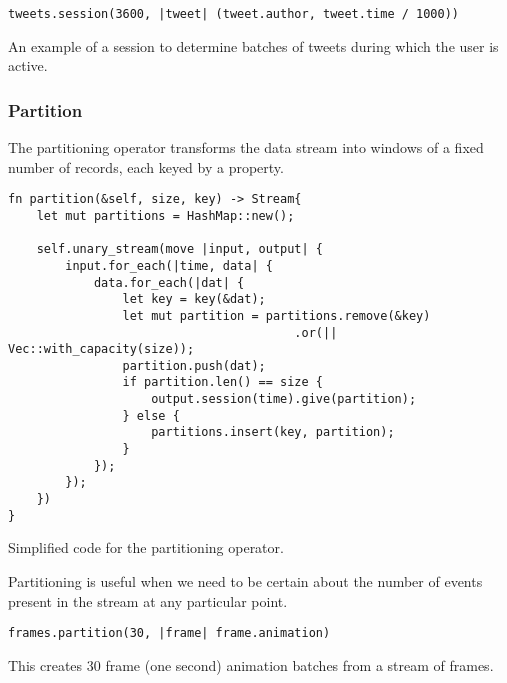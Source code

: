 \begin{listing}[H]
\begin{verbatim}
tweets.session(3600, |tweet| (tweet.author, tweet.time / 1000))
\end{verbatim}
\caption{An example of a session to determine batches of tweets during which the user is active.}
\label{lst:session-example}
\end{listing}

\subsubsection{Partition}
The partitioning operator transforms the data stream into windows of a fixed number of records, each keyed by a property.

\begin{listing}[H]
\begin{verbatim}
fn partition(&self, size, key) -> Stream{
    let mut partitions = HashMap::new();

    self.unary_stream(move |input, output| {
        input.for_each(|time, data| {
            data.for_each(|dat| {
                let key = key(&dat);
                let mut partition = partitions.remove(&key)
                                        .or(|| Vec::with_capacity(size));
                partition.push(dat);
                if partition.len() == size {
                    output.session(time).give(partition);
                } else {
                    partitions.insert(key, partition);
                }
            });
        });
    })
}
\end{verbatim}
  \caption{Simplified code for the partitioning operator.}
  \label{lst:reduce-to}
\end{listing}

Partitioning is useful when we need to be certain about the number of events present in the stream at any particular point.

\begin{listing}[H]
\begin{verbatim}
frames.partition(30, |frame| frame.animation)
\end{verbatim}
\caption{This creates 30 frame (one second) animation batches from a stream of frames.}
\label{lst:partition-example}
\end{listing}

